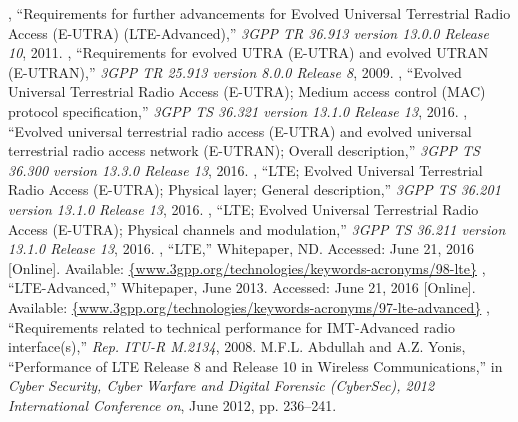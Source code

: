 %

\begin{thebibliography}{99.}%
	, ``{Requirements for further advancements for Evolved Universal Terrestrial Radio Access (E-UTRA) (LTE-Advanced)},'' \emph{{3GPP TR 36.913 version 13.0.0 Release 10}}, 2011.
	, ``{Requirements for evolved UTRA (E-UTRA) and evolved UTRAN (E-UTRAN)},'' \emph{{3GPP TR 25.913 version 8.0.0 Release 8}}, 2009.
	, ``{Evolved Universal Terrestrial Radio Access (E-UTRA); Medium access control (MAC) protocol specification},'' \emph{{3GPP TS 36.321 version 13.1.0 Release 13}}, 2016.
	, ``{Evolved universal terrestrial radio access (E-UTRA) and evolved universal terrestrial radio access network (E-UTRAN); Overall description},'' \emph{{3GPP TS 36.300 version 13.3.0 Release 13}}, 2016.
	, ``LTE; Evolved Universal Terrestrial Radio Access (E-UTRA); Physical layer; General description,'' \emph{{3GPP TS 36.201 version 13.1.0 Release 13}}, 2016.
	, ``LTE; Evolved Universal Terrestrial Radio Access (E-UTRA); Physical channels and modulation,'' \emph{{3GPP TS 36.211 version 13.1.0 Release 13}}, 2016.
	, ``{LTE},'' Whitepaper, ND. Accessed: June 21, 2016 [Online]. Available: \url{{www.3gpp.org/technologies/keywords-acronyms/98-lte}}
	, ``{LTE-Advanced},'' Whitepaper, June 2013. Accessed: June 21, 2016 [Online]. Available: \url{{www.3gpp.org/technologies/keywords-acronyms/97-lte-advanced}} 
	, ``Requirements related to technical performance for IMT-Advanced radio interface(s),'' \emph{Rep. ITU-R M.2134}, 2008. 
	 {M.F.L. Abdullah and A.Z. Yonis}, ``{Performance of LTE Release 8 and Release 10 in Wireless Communications},'' in \emph{{Cyber Security, Cyber Warfare and Digital Forensic (CyberSec), 2012 International Conference on}}, June 2012, pp. 236--241.
		
\end{thebibliography}